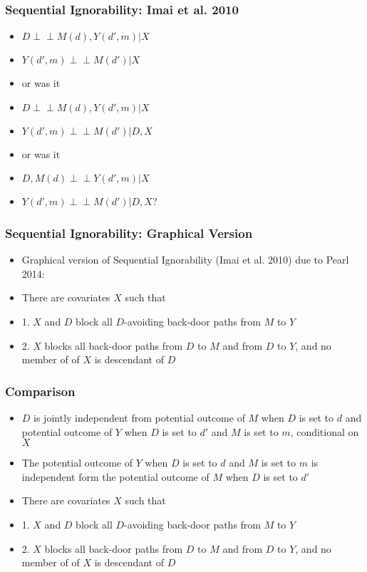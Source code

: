 \documentclass{beamer}
\newcommand{\indep}{\mbox{$\perp\!\!\!\perp$}}
\begin{document}
\begin{frame}[t]
\frametitle{Sequential Ignorability: Imai et al. 2010}
\begin{itemize}
	\item<1-> $D \indep M(d), Y(d', m)|X$
	\item<2-> $Y(d', m) \indep M(d')|X$
	\item<3-> or was it
		\item<4-> $D \indep M(d), Y(d', m)|X$
	\item<5-> $Y(d', m) \indep M(d')|D, X$
		\item<6-> or was it
	\item<7-> $D, M(d) \indep Y(d', m)|X$
	\item<8-> $Y(d', m) \indep M(d')|D, X$?
\end{itemize}
\end{frame}

\begin{frame}[t]
\frametitle{Sequential Ignorability: Graphical Version}
\begin{itemize}
	\item<1-> Graphical version of Sequential Ignorability (Imai et al. 2010) due to Pearl 2014:
	\item<1-> There are covariates $X$ such that 
	\item<2-> 1. $X$ and $D$ block all $D$-avoiding back-door paths from $M$ to $Y$	
	\item<2-> 2. $X$ blocks all back-door paths from $D$ to $M$ and from $D$ to $Y$, and no member of of $X$ is descendant of $D$
\end{itemize}
\end{frame}

\begin{frame}[t]
\frametitle{Comparison}
\begin{itemize}
	\item<1-> $D$ is jointly independent from potential outcome of $M$ when $D$ is set to $d$ and potential outcome of $Y$ when $D$ is set to $d'$ and $M$ is set to $m$, conditional on $X$
	\item<1-> The potential outcome of $Y$ when $D$ is set to $d$ and $M$ is set to $m$ is independent form the potential outcome of $M$ when $D$ is set to $d'$
	\item<2-> There are covariates $X$ such that 
	\item<2-> 1. $X$ and $D$ block all $D$-avoiding back-door paths from $M$ to $Y$	
	\item<2-> 2. $X$ blocks all back-door paths from $D$ to $M$ and from $D$ to $Y$, and no member of of $X$ is descendant of $D$
\end{itemize}
\end{frame}
\end{document}

